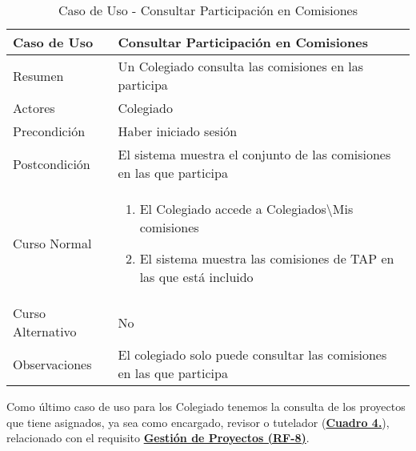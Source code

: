 \begin{table}[!htbp]
  \centering  \addtocounter{casouso}{1}
  \begin{tabular}{|l | p{100mm}|}
    \textbf{Caso de Uso}  & \textbf{Consultar Participación en Comisiones} \\ \hline
    Resumen 		 & Un Colegiado consulta las comisiones en las participa \\ \hline
    Actores  		 & Colegiado \\ \hline
    Precondición  	 & Haber iniciado sesión \\ \hline
    Postcondición  	 & El sistema muestra el conjunto de las comisiones en las que participa \\ \hline
    Curso Normal   	 & \begin{enumerate}
	  \item El Colegiado accede a Colegiados\textbackslash Mis comisiones
	  \item El sistema muestra las comisiones de TAP en las que está incluido
    \end{enumerate}  \\ \hline
    Curso Alternativo  & No  \\ \hline
    Observaciones 	 & El colegiado solo puede consultar las comisiones en las que participa \\ \hline
  \end{tabular}
  \caption{Caso de Uso  - Consultar Participación en Comisiones}
  \label{tab:cucConsultaComision}
\end{table}
\FloatBarrier


\addtocounter{tabla}{1}
Como último caso de uso para los Colegiado tenemos la consulta de los proyectos que tiene asignados, ya sea como encargado, revisor o tutelador (\textbf{\hyperref[tab:cucConsultaProyectos]{Cuadro 4.}}), relacionado con el requisito \textbf{\hyperref[tab:rfGestProyectos]{Gestión de Proyectos (RF-8)}}.

